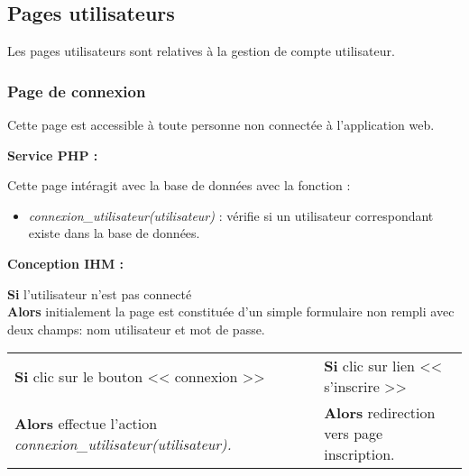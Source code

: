 
	\clearpage

	\subsection{Pages utilisateurs}
      \begin{paragraphe}
            Les pages utilisateurs sont relatives à la gestion de compte utilisateur.
        \end{paragraphe}

		\subsubsection{Page de connexion}

			\begin{paragraphe}
				Cette page est accessible à toute personne non connectée à l'application web.
			\end{paragraphe}

			\begin{paragraphe}
				\textbf{Service PHP :}
			\end{paragraphe}

			\begin{paragraphe}
			    Cette page intéragit avec la base de données avec la fonction :
				\begin{itemize}
					\item \emph{connexion\_utilisateur(utilisateur)} : vérifie si un utilisateur correspondant existe dans la base de données.
				\end{itemize}
			\end{paragraphe}

			\begin{paragraphe}
				\textbf{Conception IHM :}
			\end{paragraphe}

			\begin{paragraphe}
				\textbf{Si} l'utilisateur n'est pas connecté \\
				\textbf{Alors} initialement la page est constituée d'un simple formulaire non rempli avec deux champs: nom utilisateur et mot de passe.
			\end{paragraphe}

            \begin{center}
                \begin{tabular}{l c | c l}
                    \textbf{Si} clic sur le bouton << connexion >> & & & \textbf{Si} clic sur lien  << s'inscrire >> \\
                    \textbf{Alors} effectue l'action \emph{connexion\_utilisateur(utilisateur).} & & & \textbf{Alors} redirection vers page inscription.
                \end{tabular}
            \end{center}

